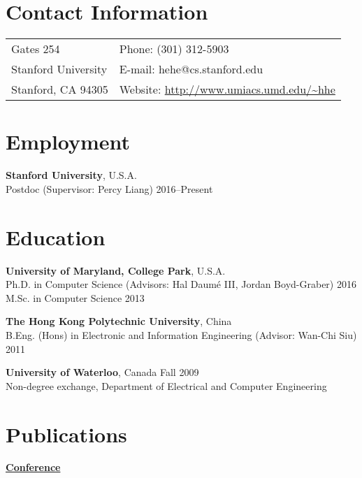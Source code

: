 \documentclass[margin,line]{resume}
\begin{document}

\begin{resume}
\section{\sc Contact Information}
\vspace{.05in}
\begin{tabular}{@{}p{2.5in}p{4in}}
Gates 254             & Phone: (301) 312-5903 \\            
Stanford University   & E-mail: hehe@cs.stanford.edu \\         
Stanford, CA 94305    & Website: \url{http://www.umiacs.umd.edu/~hhe}\\        
\end{tabular}

\section{\sc Employment}
{\bf Stanford University}, U.S.A.\\
Postdoc (Supervisor: Percy Liang) \hfill 2016--Present

\section{\sc Education}
{\bf University of Maryland, College Park}, U.S.A.\\
Ph.D. in Computer Science (Advisors: Hal Daum\'e III, Jordan Boyd-Graber) \hfill 2016\\
M.Sc. in Computer Science \hfill 2013

{\bf The Hong Kong Polytechnic University}, China\\ 
B.Eng. (Hons) in Electronic and Information Engineering (Advisor: Wan-Chi Siu) \hfill 2011 %

{\bf University of Waterloo}, Canada \hfill Fall 2009\\
Non-degree exchange, Department of Electrical and Computer Engineering %

\section{\sc Publications}
{\bf\underline{Conference}}


\end{resume}
\end{document}
